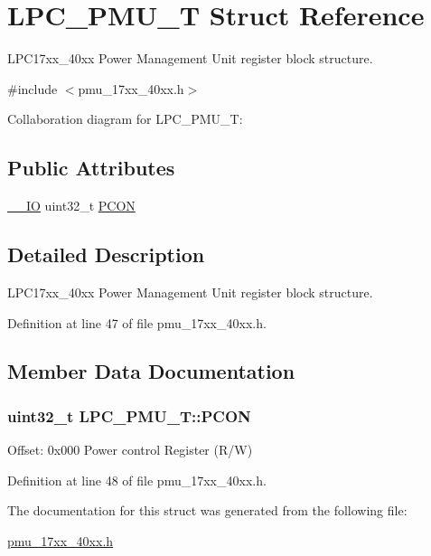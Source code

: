 \hypertarget{structLPC__PMU__T}{}\section{L\+P\+C\+\_\+\+P\+M\+U\+\_\+T Struct Reference}
\label{structLPC__PMU__T}


L\+P\+C17xx\+\_\+40xx Power Management Unit register block structure.  




{\ttfamily \#include $<$pmu\+\_\+17xx\+\_\+40xx.\+h$>$}



Collaboration diagram for L\+P\+C\+\_\+\+P\+M\+U\+\_\+T\+:
\subsection*{Public Attributes}
\begin{DoxyCompactItemize}
\item 
\hyperlink{core__cm3_8h_aec43007d9998a0a0e01faede4133d6be}{\+\_\+\+\_\+\+IO} uint32\+\_\+t \hyperlink{structLPC__PMU__T_a9b889ba60e56c881274ac9eaebecaf66}{P\+C\+ON}
\end{DoxyCompactItemize}


\subsection{Detailed Description}
L\+P\+C17xx\+\_\+40xx Power Management Unit register block structure. 

Definition at line 47 of file pmu\+\_\+17xx\+\_\+40xx.\+h.



\subsection{Member Data Documentation}
\subsubsection[{\texorpdfstring{P\+C\+ON}{PCON}}]{ uint32\+\_\+t L\+P\+C\+\_\+\+P\+M\+U\+\_\+\+T\+::\+P\+C\+ON}\hypertarget{structLPC__PMU__T_a9b889ba60e56c881274ac9eaebecaf66}{}\label{structLPC__PMU__T_a9b889ba60e56c881274ac9eaebecaf66}
Offset\+: 0x000 Power control Register (R/W) 

Definition at line 48 of file pmu\+\_\+17xx\+\_\+40xx.\+h.



The documentation for this struct was generated from the following file\+:\begin{DoxyCompactItemize}
\item 
\hyperlink{pmu__17xx__40xx_8h}{pmu\+\_\+17xx\+\_\+40xx.\+h}\end{DoxyCompactItemize}
